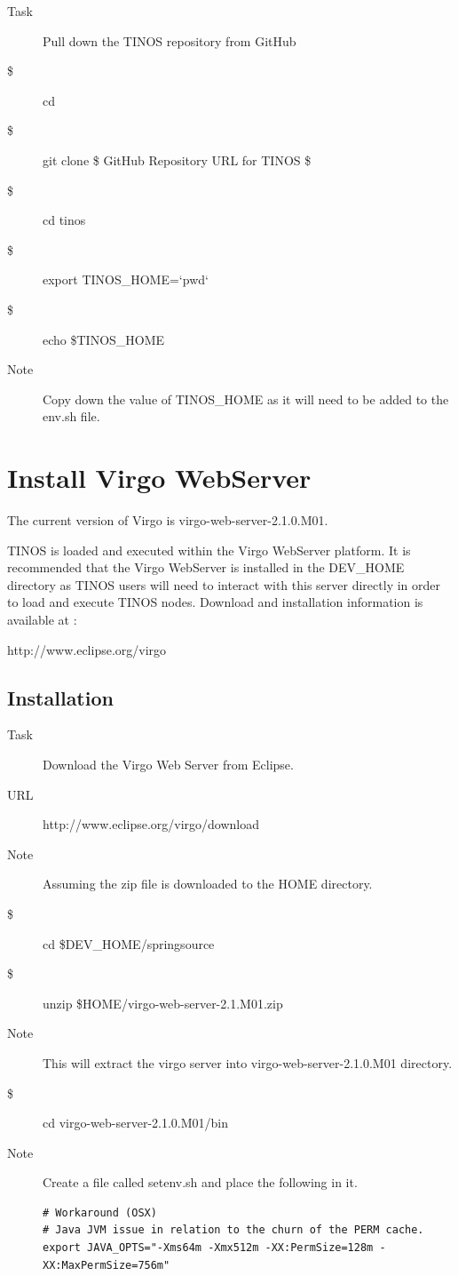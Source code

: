 \begin{description}
 \item[Task] Pull down the TINOS repository from GitHub
 \item[\$] cd
 \item[\$] git clone \$ GitHub Repository URL for TINOS \$
 \item[\$] cd tinos
 \item[\$] export TINOS\_HOME=`pwd`
 \item[\$] echo \$TINOS\_HOME
 \item[Note] Copy down the value of TINOS\_HOME as it will need to be added to the
 env.sh file.
\end{description}

\section{Install Virgo WebServer}

The current version of Virgo is virgo-web-server-2.1.0.M01.

TINOS is loaded and executed within the Virgo WebServer platform. It is
recommended that the Virgo WebServer is installed in the DEV\_HOME
directory as TINOS users will need to interact with this server directly in order
to load and execute TINOS nodes. Download and installation information
is available at :

\begin{center}
http://www.eclipse.org/virgo
\end{center}

\subsection{Installation}
\begin{description}
 \item[Task] Download the Virgo Web Server from Eclipse.
 \item[URL] http://www.eclipse.org/virgo/download
 \item[Note] Assuming the zip file is downloaded to the HOME directory.
 \item[\$] cd \$DEV\_HOME/springsource
 \item[\$] unzip \$HOME/virgo-web-server-2.1.M01.zip
 \item[Note] This will extract the virgo server into virgo-web-server-2.1.0.M01 directory.
 \item[\$] cd virgo-web-server-2.1.0.M01/bin
 \item[Note] Create a file called setenv.sh and place the following in it.
\begin{verbatim}
# Workaround (OSX)
# Java JVM issue in relation to the churn of the PERM cache.
export JAVA_OPTS="-Xms64m -Xmx512m -XX:PermSize=128m -XX:MaxPermSize=756m"
\end{verbatim}
\end{description}

